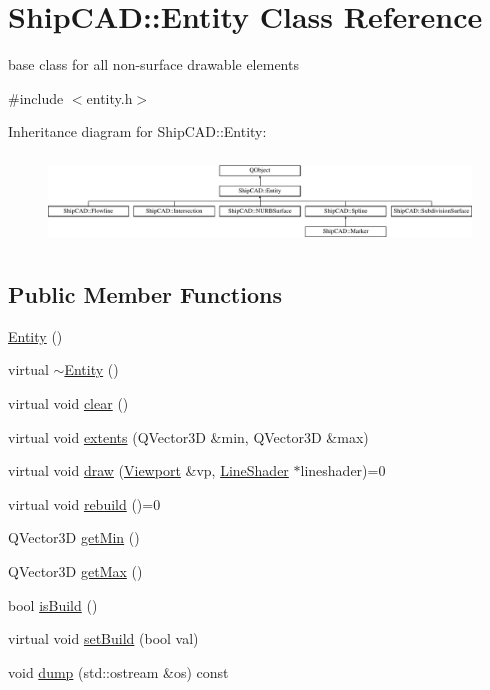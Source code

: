 \hypertarget{classShipCAD_1_1Entity}{\section{Ship\-C\-A\-D\-:\-:Entity Class Reference}
\label{classShipCAD_1_1Entity}
}


base class for all non-\/surface drawable elements  




{\ttfamily \#include $<$entity.\-h$>$}

Inheritance diagram for Ship\-C\-A\-D\-:\-:Entity\-:\begin{figure}[H]
\begin{center}
\leavevmode
\includegraphics[height=2.382979cm]{classShipCAD_1_1Entity}
\end{center}
\end{figure}
\subsection*{Public Member Functions}
\begin{DoxyCompactItemize}
\item 
\hyperlink{classShipCAD_1_1Entity_a980f368aa07ce358583982821533a54a}{Entity} ()
\item 
virtual \hyperlink{classShipCAD_1_1Entity_a0fe3f9f7c8875a85afb214c8ebd75604}{$\sim$\-Entity} ()
\item 
virtual void \hyperlink{classShipCAD_1_1Entity_a998d0e5d360371046fd5835ba1e0877a}{clear} ()
\item 
virtual void \hyperlink{classShipCAD_1_1Entity_a08e8e53770c85002afa45f46e7bf10f8}{extents} (Q\-Vector3\-D \&min, Q\-Vector3\-D \&max)
\item 
virtual void \hyperlink{classShipCAD_1_1Entity_aa62e306d991140dcd564360f8f6e7539}{draw} (\hyperlink{classShipCAD_1_1Viewport}{Viewport} \&vp, \hyperlink{classShipCAD_1_1LineShader}{Line\-Shader} $\ast$lineshader)=0
\item 
virtual void \hyperlink{classShipCAD_1_1Entity_a2571654319df6ad6841a437be7a75395}{rebuild} ()=0
\item 
Q\-Vector3\-D \hyperlink{classShipCAD_1_1Entity_a759d6dedd36bf6562fbf36e816d9a5af}{get\-Min} ()
\item 
Q\-Vector3\-D \hyperlink{classShipCAD_1_1Entity_a3af98adafb45eb573675a8ccc44fe14e}{get\-Max} ()
\item 
bool \hyperlink{classShipCAD_1_1Entity_a131cd27d923ba1d2658528b679b9a90c}{is\-Build} ()
\item 
virtual void \hyperlink{classShipCAD_1_1Entity_a1889198398f42bb7f77a2334031c3f33}{set\-Build} (bool val)
\item 
void \hyperlink{classShipCAD_1_1Entity_a395d7573df06482d9deaecdc87d46944}{dump} (std\-::ostream \&os) const 
\end{DoxyCompactItemize}
